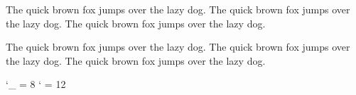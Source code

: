 \documentclass{article}
\begin{document}
The quick brown fox jumps over the lazy dog.
The quick brown fox jumps over the lazy dog.
The quick brown fox jumps over the lazy dog.



The quick brown fox jumps over the lazy dog.
The quick brown fox jumps over the lazy dog.
The quick brown fox jumps over the lazy dog.



\catcode `\_ = 8 \catcode `\: = 12
\end{document}
